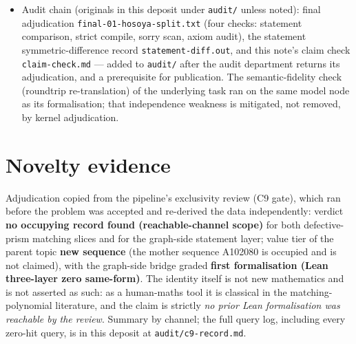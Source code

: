 \documentclass[11pt]{article}
\theoremstyle{definition}
\begin{document}
\begin{itemize}
\emph{complete proof}; lowest grade reached for the case = \emph{complete
proof}, with one provenance caveat stated by the audit and carried here: the
mathematical skeleton of Lemma~\ref{lem:split} was produced by a worker agent
in a scratch probe (compiling) and was adapted to the two-point-set form by
the main agent to match the frozen statement's instance-synthesis path; the
provenance is recorded in the final file header and in the audit record, and
the deposit does not narrate the lemma as an independent single-author pass.
\item Audit chain (originals in this deposit under \texttt{audit/} unless
noted): final adjudication \texttt{final-01-hosoya-split.txt} (four checks:
statement comparison, strict compile, sorry scan, axiom audit), the statement
symmetric-difference record \texttt{statement-diff.out}, and this note's
claim check \texttt{claim-check.md} --- added to \texttt{audit/} after the
audit department returns its adjudication, and a prerequisite for
publication. The semantic-fidelity check (roundtrip re-translation) of the
underlying task ran on the same model node as its formalisation; that
independence weakness is mitigated, not removed, by kernel adjudication.
\end{itemize}

\section{Novelty evidence}\label{sec:novelty}

Adjudication copied from the pipeline's exclusivity review (C9 gate), which
ran before the problem was accepted and re-derived the data independently:
verdict \textbf{no occupying record found (reachable-channel scope)} for both
defective-prism matching slices and for the graph-side statement layer; value
tier of the parent topic \textbf{new sequence} (the mother sequence
A102080 \cite{a102080} is occupied and is not claimed), with the graph-side
bridge graded \textbf{first formalisation (Lean three-layer zero same-form)}.
The identity itself is not new mathematics and is not asserted as such: as a
human-maths tool it is classical in the matching-polynomial literature, and
the claim is strictly \emph{no prior Lean formalisation was reachable by the
review}. Summary by channel; the full query log, including every zero-hit
query, is in this deposit at \texttt{audit/c9-record.md}.
\end{document}
